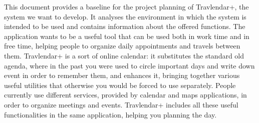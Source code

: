 This document provides a baseline for the project planning of Travlendar+, the system we want to develop. It analyses the environment in which the system is intended to be used and contains information about the offered functions.
\newline
\newline
The application wants to be a useful tool that can be used both in work time and in free time, helping people to organize daily appointments and travels between them.
\newline
\newline
Travlendar+ is a sort of online calendar: it substitutes the standard old agenda, where in the past you were used to circle important days and write down event in order to remember them, and enhances it, bringing together various useful utilities that otherwise you would be forced to use separately.
\newline
People currently use different services, provided by calendar and maps applications, in order to organize meetings and events. Travlendar+ includes all these useful functionalities in the same application, helping you planning the day.